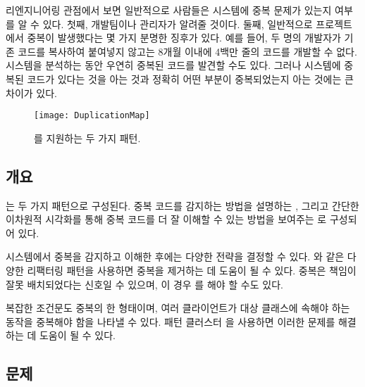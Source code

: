 \documentclass[a4paper,10pt,twoside]{book}
\begin{document}
리엔지니어링 관점에서 보면 일반적으로 사람들은 시스템에 중복 문제가 있는지 여부를 알 수 있다. 첫째, 개발팀이나 관리자가 알려줄 것이다. 둘째, 일반적으로 프로젝트에서 중복이 발생했다는 몇 가지 분명한 징후가 있다. 예를 들어, 두 명의 개발자가 기존 코드를 복사하여 붙여넣지 않고는 8개월 이내에 4백만 줄의 코드를 개발할 수 없다. 시스템을 분석하는 동안 우연히 중복된 코드를 발견할 수도 있다. 그러나 시스템에 중복된 코드가 있다는 것을 아는 것과 정확히 어떤 부분이 중복되었는지 아는 것에는 큰 차이가 있다. 

\begin{figure}[h]
\begin{center}
\texttt{[image: DuplicationMap]}
\caption{를 지원하는 두 가지 패턴.}
\end{center}
\end{figure}

\subsection*{개요}

는 두 가지 패턴으로 구성된다. 중복 코드를 감지하는 방법을 설명하는 , 그리고 간단한 이차원적 시각화를 통해 중복 코드를 더 잘 이해할 수 있는 방법을 보여주는 로 구성되어 있다.

시스템에서 중복을 감지하고 이해한 후에는 다양한 전략을 결정할 수 있다. 와 같은 다양한 리팩터링 패턴을 사용하면 중복을 제거하는 데 도움이 될 수 있다. 중복은 책임이 잘못 배치되었다는 신호일 수 있으며, 이 경우 를 해야 할 수도 있다. 

복잡한 조건문도 중복의 한 형태이며, 여러 클라이언트가 대상 클래스에 속해야 하는 동작을 중복해야 함을 나타낼 수 있다. 패턴 클러스터 을 사용하면 이러한 문제를 해결하는 데 도움이 될 수 있다.



\subsection*{문제}
\end{document}
